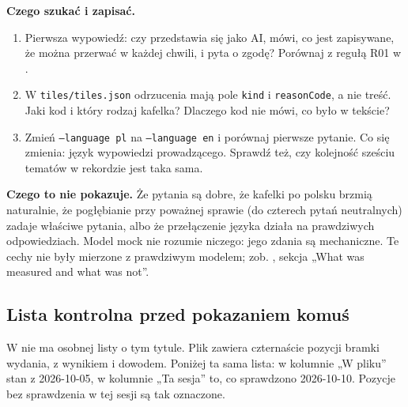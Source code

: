 {\textbf{Czego szukać i zapisać.}
\begin{enumerate}[leftmargin=2em,itemsep=1pt]
  \item Pierwsza wypowiedź: czy przedstawia się jako AI, mówi, co jest zapisywane, że można
        przerwać w każdej chwili, i pyta o zgodę? Porównaj z regułą R01 w
        .
  \item W \texttt{tiles/tiles.json} odrzucenia mają pole \texttt{kind} i \texttt{reasonCode},
        a nie treść. Jaki kod i który rodzaj kafelka? Dlaczego kod nie mówi, co było w tekście?
  \item Zmień \texttt{--language pl} na \texttt{--language en} i porównaj pierwsze pytanie.
        Co się zmienia: język wypowiedzi prowadzącego. Sprawdź też, czy kolejność sześciu
        tematów w rekordzie jest taka sama.
\end{enumerate}

\textbf{Czego to nie pokazuje.} Że pytania są dobre, że kafelki po polsku brzmią naturalnie,
że pogłębianie przy poważnej sprawie (do czterech pytań neutralnych) zadaje właściwe pytania,
albo że przełączenie języka działa na prawdziwych odpowiedziach. Model mock nie rozumie niczego:
jego zdania są mechaniczne. Te cechy nie były mierzone z prawdziwym modelem; zob.
, sekcja „What was measured and what was not”.

\subsection{Lista kontrolna przed pokazaniem komuś}

W  nie ma osobnej listy o tym tytule. Plik
zawiera czternaście pozycji bramki wydania, z wynikiem i dowodem. Poniżej ta sama
lista: w kolumnie „W pliku” stan z 2026-10-05, w kolumnie „Ta sesja” to, co
sprawdzono 2026-10-10. Pozycje bez sprawdzenia w tej sesji są tak oznaczone.

}
